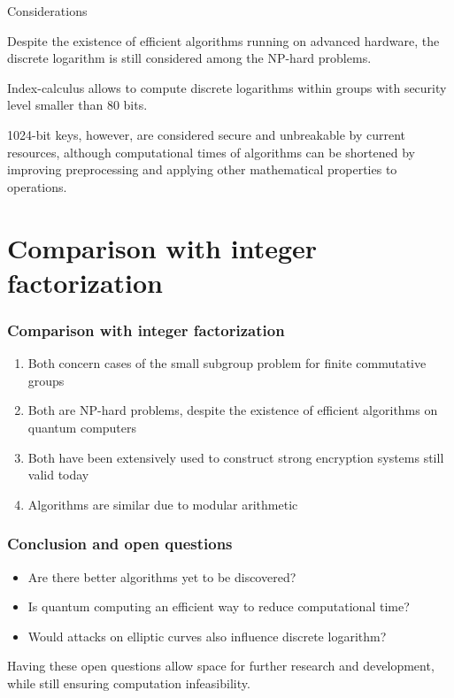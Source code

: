 \documentclass{beamer}
\begin{document}

\begin{frame}{Considerations}

Despite the existence of efficient algorithms running on advanced hardware, the discrete logarithm is still considered among the NP-hard problems. 

Index-calculus allows to compute discrete logarithms within groups with security level smaller than 80 bits.

1024-bit keys, however, are considered secure and unbreakable by current resources, although computational times of algorithms can be shortened by improving preprocessing and applying other mathematical properties to operations.
    
\end{frame}

\section{Comparison with integer factorization}
\begin{frame}
\frametitle{Comparison with integer factorization}

\begin{enumerate}
	\item Both concern cases of the small subgroup problem for finite commutative groups
	\item Both are NP-hard problems, despite the existence of efficient algorithms on quantum computers
	\item Both have been extensively used to construct strong encryption systems still valid today
	\item Algorithms are similar due to modular arithmetic
\end{enumerate}
\end{frame}


\begin{frame} %
\frametitle{Conclusion and open questions}

\begin{itemize}
	\item Are there better algorithms yet to be discovered?
	\item Is quantum computing an efficient way to reduce computational time?
	\item Would attacks on elliptic curves also influence discrete logarithm?
\end{itemize}
\bigskip
Having these open questions allow space for further research and development, while still ensuring computation infeasibility. 
\end{frame}
\end{document}
